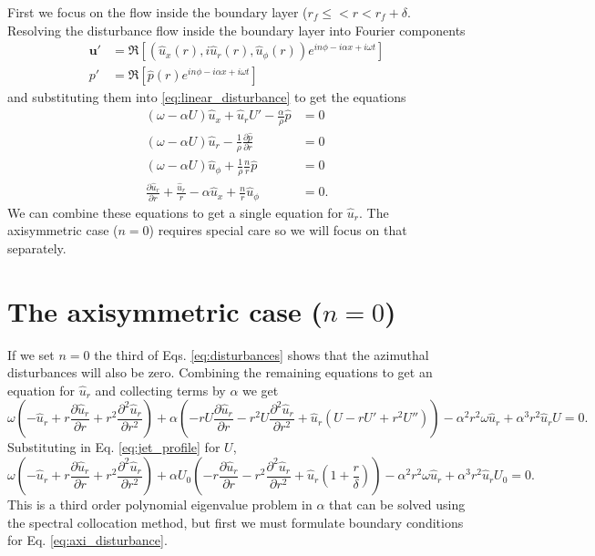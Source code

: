 \documentclass[superscriptaddress, onecolumn, prl]{revtex4}
\begin{document}
First we focus on the flow inside the boundary layer ($r_f \leq < r < r_f+\delta$. Resolving the disturbance flow inside the boundary layer into Fourier components
\begin{equation}
\begin{split}
 \textbf{u}' & = \Re \left[ \left( \hat{u}_x(r), i \hat{u}_r(r), \hat{u}_{\phi}(r) \right) e^{in\phi - i \alpha x + i \omega t}   \right] \\
 p' & = \Re \left[ \hat{p}(r) e^{in\phi - i \alpha x + i \omega t} \right]
\end{split}
\end{equation}
and substituting them into \ref{eq:linear_disturbance} to get the equations
\begin{equation}
\label{eq:disturbances}
\begin{split}
(\omega - \alpha U )\hat{u}_x  + \hat{u}_r U' - \frac{\alpha}{\rho} \hat{p} & = 0 \\
(\omega -  \alpha U )\hat{u}_r - \frac{1}{\rho}\frac{\partial \hat{p}}{\partial r} & = 0 \\
(\omega -  \alpha U ) \hat{u}_{\phi} + \frac{1}{\rho}\frac{n}{r} \hat{p} & = 0 \\
\frac{\partial \hat{u}_r}{\partial r} + \frac{\hat{u}_r}{r} - \alpha \hat{u}_x + \frac{n}{r} \hat{u}_{\phi} &=0.  
\end{split}
\end{equation}
We can combine these equations to get a single equation for $\hat{u}_r$. The axisymmetric case ($n=0$) requires special care so we will focus on that separately.

\section{The axisymmetric case ($n=0$)}
If we set $n=0$ the third of Eqs. \ref{eq:disturbances} shows that the azimuthal disturbances will also be zero. Combining the remaining equations to get an equation for $\hat{u}_r$ and collecting terms by $\alpha$ we get
\begin{equation}
\label{eq:axi_disturbance1}
\omega  \left(-\hat{u}_r+r \frac{\partial \hat{u}_r}{\partial r} + r^2 \frac{\partial^2 \hat{u}_r}{\partial r^2}\right) + \alpha  \left(-r U \frac{\partial \hat{u}_r}{\partial r} - r^2 U \frac{\partial^2 \hat{u}_r}{\partial r^2} +\hat{u}_r \left(U -r U'+r^2 U'' \right) \right)- \alpha^2 r^2 \omega  \hat{u}_r + \alpha^3 r^2 \hat{u}_r U = 0.
\end{equation}
Substituting in Eq. \ref{eq:jet_profile} for $U$,
\begin{equation}
\label{eq:axi_disturbance2}
\omega  \left(-\hat{u}_r+r \frac{\partial \hat{u}_r}{\partial r} + r^2 \frac{\partial^2 \hat{u}_r}{\partial r^2}\right) + \alpha U_0  \left(-r \frac{\partial \hat{u}_r}{\partial r} - r^2 \frac{\partial^2 \hat{u}_r}{\partial r^2} +\hat{u}_r \left(1 + \frac{r}{\delta}\right) \right)- \alpha^2 r^2 \omega  \hat{u}_r + \alpha^3 r^2 \hat{u}_r U_0 = 0.
\end{equation} 
This is a third order polynomial eigenvalue problem in $\alpha$ that can be solved using the spectral collocation method, but first we must formulate boundary conditions for Eq. \ref{eq:axi_disturbance}.
\end{document}
